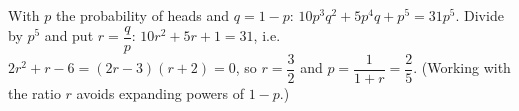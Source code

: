 With $p$ the probability of heads and $q=1-p$: $10p^3q^2+5p^4q+p^5=31p^5$. Divide by $p^5$ and put $r=\dfrac qp$: $10r^2+5r+1=31$, i.e. $2r^2+r-6=(2r-3)(r+2)=0$, so $r=\dfrac32$ and $p=\dfrac1{1+r}=\boxed{\dfrac25}$. (Working with the ratio $r$ avoids expanding powers of $1-p$.)
